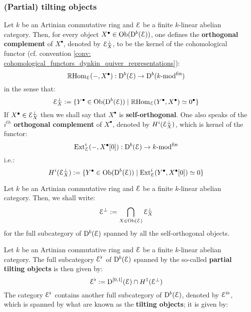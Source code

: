         \subsubsection{(Partial) tilting objects}
            \begin{definition} \label{def: orthogonal_objects}
                Let $k$ be an Artinian commutative ring and $\mathcal{E}$ be a finite $k$-linear abelian category. Then, for every object $X^{\bullet} \in \mathrm{Ob}(\mathrm{D}^b(\mathcal{E}))$, one defines the \textbf{orthogonal complement} of $X^{\bullet}$, denoted by $\mathcal{E}_X^{\bot}$, to be the kernel of the cohomological functor (cf. convention \ref{conv: cohomological_functors_dynkin_quiver_representations}):
                    $$\mathbb{R}\mathrm{Hom}_{\mathcal{E}}(-, X^{\bullet}): \mathrm{D}^b(\mathcal{E}) \to \mathrm{D}^b(k\text{-}\mathrm{mod}^{\mathrm{fin}})$$
                in the sense that:
                    $$\mathcal{E}_X^{\bot} := \{Y^{\bullet} \in \mathrm{Ob}(\mathrm{D}^b(\mathcal{E})) \mid \mathbb{R}\mathrm{Hom}_{\mathcal{E}}(Y^{\bullet}, X^{\bullet}) \simeq 0^{\bullet}\}$$
                If $X^{\bullet} \in \mathcal{E}_X^{\bot}$ then we shall say that $X^{\bullet}$ is \textbf{self-orthogonal}. One also speaks of the \textbf{$i^{th}$ orthogonal complement} of $X^{\bullet}$, denoted by $H^i(\mathcal{E}_X^{\bot})$, which is kernel of the functor:
                    $$\mathrm{Ext}^i_{\mathcal{E}}(-, X^{\bullet}[0]): \mathrm{D}^b(\mathcal{E}) \to k\text{-}\mathrm{mod}^{\mathrm{fin}}$$
                i.e.:
                    $$H^i(\mathcal{E}_X^{\bot}) := \{Y^{\bullet} \in \mathrm{Ob}(\mathrm{D}^b(\mathcal{E})) \mid \mathrm{Ext}^i_{\mathcal{E}}(Y^{\bullet}, X^{\bullet}[0]) \simeq 0\}$$
            \end{definition}
            \begin{convention}
                Let $k$ be an Artinian commutative ring and $\mathcal{E}$ be a finite $k$-linear abelian category. Then, we shall write:
                    $$\mathcal{E}^{\bot} := \bigcap_{X \in \mathrm{Ob}(\mathcal{E})} \mathcal{E}_X^{\bot}$$
                for the full subcategory of $\mathrm{D}^b(\mathcal{E})$ spanned by all the self-orthogonal objects. 
            \end{convention}
            \begin{definition} \label{def: partial_tilting_objects}
                Let $k$ be an Artinian commutative ring and $\mathcal{E}$ be a finite $k$-linear abelian category. The full subcategory $\mathcal{E}^{\flat}$ of $\mathrm{D}^b(\mathcal{E})$ spanned by the so-called \textbf{partial tilting objects} is then given by:
                    $$\mathcal{E}^{\flat} := \mathrm{D}^{[0, 1]}(\mathcal{E}) \cap H^1(\mathcal{E}^{\bot})$$
                The category $\mathcal{E}^{\flat}$ contains another full subcategory of $\mathrm{D}^b(\mathcal{E})$, denoted by $\mathcal{E}^{\flat \flat}$, which is spanned by what are known as the \textbf{tilting objects}; it is given by:
            \end{definition}
        

